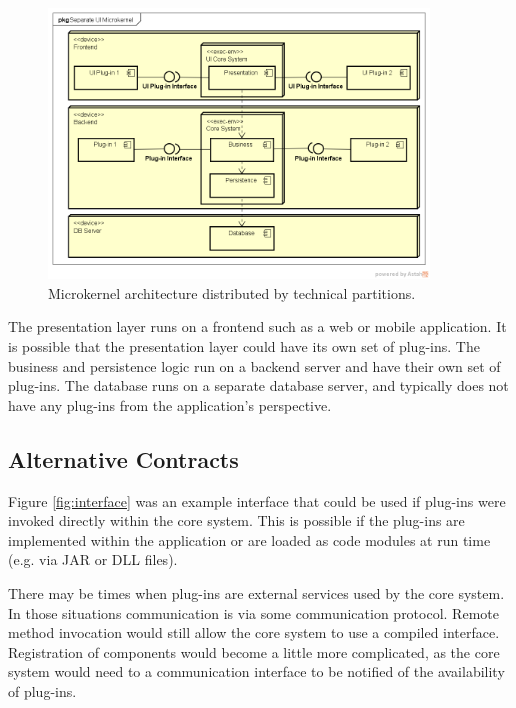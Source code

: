 \begin{figure}[h!]
    \centering
    \includegraphics[trim=40 41 18 43,clip,width=0.9\textwidth]{diagrams/separate-ui-microkernel.png}
    \caption{Microkernel architecture distributed by technical partitions.}
    \label{fig:3-tier-microkernel}
\end{figure}

The presentation layer runs on a frontend such as a web or mobile application.
It is possible that the presentation layer could have its own set of plug-ins.
The business and persistence logic run on a backend server and have their own set of plug-ins.
The database runs on a separate database server, and typically does not have any plug-ins from the application's perspective.

\subsection{Alternative Contracts}

Figure \ref{fig:interface} was an example interface that could be used if plug-ins were invoked directly within the core system.
This is possible if the plug-ins are implemented within the application or are loaded as code modules at run time (e.g. via JAR or DLL files).

There may be times when plug-ins are external services used by the core system.
In those situations communication is via some communication protocol.
Remote method invocation would still allow the core system to use a compiled interface.
Registration of components would become a little more complicated,
as the core system would need to a communication interface to be notified of the availability of plug-ins.

